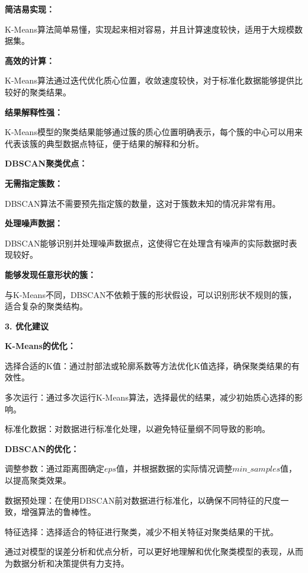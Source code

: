\documentclass[a4paper]{article}
\begin{document}
\textbf{简洁易实现：}

K-Means算法简单易懂，实现起来相对容易，并且计算速度较快，适用于大规模数据集。

\textbf{高效的计算：}

K-Means算法通过迭代优化质心位置，收敛速度较快，对于标准化数据能够提供比较好的聚类结果。

\textbf{结果解释性强：}

K-Means模型的聚类结果能够通过簇的质心位置明确表示，每个簇的中心可以用来代表该簇的典型数据点特征，便于结果的解释和分析。

\textbf{DBSCAN聚类优点：}

\textbf{无需指定簇数：}

DBSCAN算法不需要预先指定簇的数量，这对于簇数未知的情况非常有用。

\textbf{处理噪声数据：}

DBSCAN能够识别并处理噪声数据点，这使得它在处理含有噪声的实际数据时表现较好。

\textbf{能够发现任意形状的簇：}

与K-Means不同，DBSCAN不依赖于簇的形状假设，可以识别形状不规则的簇，适合复杂的聚类结构。

\textbf{3. 优化建议}

\textbf{K-Means的优化：}


选择合适的K值：通过肘部法或轮廓系数等方法优化K值选择，确保聚类结果的有效性。

多次运行：通过多次运行K-Means算法，选择最优的结果，减少初始质心选择的影响。

标准化数据：对数据进行标准化处理，以避免特征量纲不同导致的影响。

\textbf{DBSCAN的优化：}

调整参数：通过距离图确定$eps$值，并根据数据的实际情况调整$min\_samples$值，以提高聚类效果。

数据预处理：在使用DBSCAN前对数据进行标准化，以确保不同特征的尺度一致，增强算法的鲁棒性。

特征选择：选择适合的特征进行聚类，减少不相关特征对聚类结果的干扰。

通过对模型的误差分析和优点分析，可以更好地理解和优化聚类模型的表现，从而为数据分析和决策提供有力支持。

\newpage
\pagestyle{plain}
\end{document}
